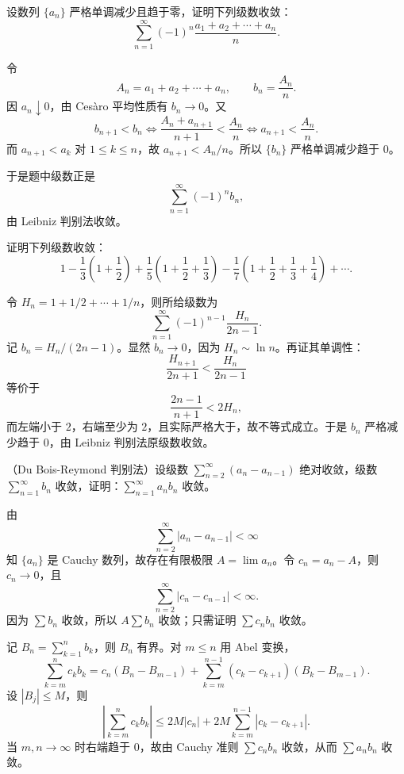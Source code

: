 \begin{xexercise}[6]
设数列 $\{a_n\}$ 严格单调减少且趋于零，证明下列级数收敛：
\[
\sum_{n=1}^{\infty}(-1)^n\frac{a_1+a_2+\cdots+a_n}{n}.
\]
\end{xexercise}
\begin{xsolution}
令
\[
 A_n=a_1+a_2+\cdots+a_n,
 \qquad
 b_n=\frac{A_n}{n}.
\]
因 $a_n\downarrow0$，由 Cesàro 平均性质有 $b_n\to0$。又
\[
 b_{n+1}<b_n
 \Longleftrightarrow
 \frac{A_n+a_{n+1}}{n+1}<\frac{A_n}{n}
 \Longleftrightarrow
 a_{n+1}<\frac{A_n}{n}.
\]
而 $a_{n+1}<a_k$ 对 $1\leq k\leq n$，故 $a_{n+1}<A_n/n$。所以 $\{b_n\}$ 严格单调减少趋于 $0$。

于是题中级数正是
\[
 \sum_{n=1}^{\infty}(-1)^n b_n,
\]
由 Leibniz 判别法收敛。
\end{xsolution}


\begin{xexercise}[7]
证明下列级数收敛：
\[
1-\frac13\left(1+\frac12\right)+\frac15\left(1+\frac12+\frac13\right)-\frac17\left(1+\frac12+\frac13+\frac14\right)+\cdots.
\]
\end{xexercise}
\begin{xsolution}
令 $H_n=1+1/2+\cdots+1/n$，则所给级数为
\[
 \sum_{n=1}^{\infty}(-1)^{n-1}\frac{H_n}{2n-1}.
\]
记 $b_n=H_n/(2n-1)$。显然 $b_n\to0$，因为 $H_n\sim\ln n$。再证其单调性：
\[
 \frac{H_{n+1}}{2n+1}<\frac{H_n}{2n-1}
\]
等价于
\[
 \frac{2n-1}{n+1}<2H_n,
\]
而左端小于 $2$，右端至少为 $2$，且实际严格大于，故不等式成立。于是 $b_n$ 严格减少趋于 $0$，由 Leibniz 判别法原级数收敛。
\end{xsolution}


\begin{xexercise}[8]
（Du Bois-Reymond 判别法）设级数 $\sum_{n=2}^{\infty}(a_n-a_{n-1})$ 绝对收敛，级数 $\sum_{n=1}^{\infty}b_n$ 收敛，证明：$\sum_{n=1}^{\infty}a_nb_n$ 收敛。
\end{xexercise}
\begin{xsolution}
由
\[
 \sum_{n=2}^{\infty}|a_n-a_{n-1}|<\infty
\]
知 $\{a_n\}$ 是 Cauchy 数列，故存在有限极限 $A=\lim a_n$。令 $c_n=a_n-A$，则 $c_n\to0$，且
\[
 \sum_{n=2}^{\infty}|c_n-c_{n-1}|<\infty.
\]
因为 $\sum b_n$ 收敛，所以 $A\sum b_n$ 收敛；只需证明 $\sum c_nb_n$ 收敛。

记 $B_n=\sum_{k=1}^{n}b_k$，则 $B_n$ 有界。对 $m\leq n$ 用 Abel 变换，
\[
 \sum_{k=m}^{n}c_kb_k
 =c_n(B_n-B_{m-1})
 +\sum_{k=m}^{n-1}(c_k-c_{k+1})(B_k-B_{m-1}).
\]
设 $|B_j|\leq M$，则
\[
 \left|\sum_{k=m}^{n}c_kb_k\right|
 \leq2M|c_n|+2M\sum_{k=m}^{n-1}|c_k-c_{k+1}|.
\]
当 $m,n\to\infty$ 时右端趋于 $0$，故由 Cauchy 准则 $\sum c_nb_n$ 收敛，从而 $\sum a_nb_n$ 收敛。
\end{xsolution}


